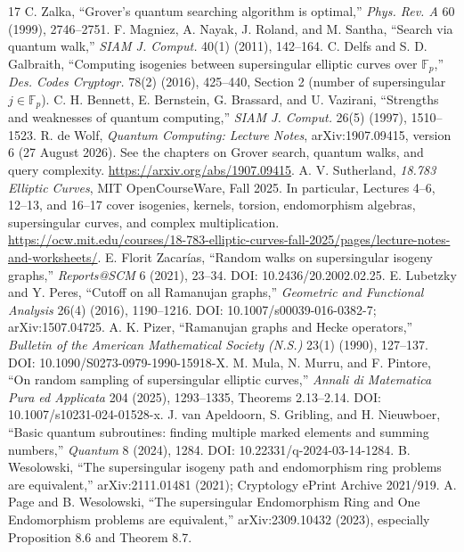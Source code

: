\documentclass[10pt,a4paper]{article}
\begin{document}
\begin{thebibliography}{17}\footnotesize\setlength{\itemsep}{0pt}
 C. Zalka, ``Grover's quantum searching algorithm is optimal,'' \emph{Phys. Rev. A} 60 (1999), 2746--2751.
 F. Magniez, A. Nayak, J. Roland, and M. Santha, ``Search via quantum walk,'' \emph{SIAM J. Comput.} 40(1) (2011), 142--164.
 C. Delfs and S. D. Galbraith, ``Computing isogenies between supersingular elliptic curves over $\mathbb F_p$,'' \emph{Des. Codes Cryptogr.} 78(2) (2016), 425--440, Section 2 (number of supersingular $j\in\mathbb F_p$).
 C. H. Bennett, E. Bernstein, G. Brassard, and U. Vazirani, ``Strengths and weaknesses of quantum computing,'' \emph{SIAM J. Comput.} 26(5) (1997), 1510--1523.
 R. de Wolf, \emph{Quantum Computing: Lecture Notes}, arXiv:1907.09415, version 6 (27 August 2026). See the chapters on Grover search, quantum walks, and query complexity. \url{https://arxiv.org/abs/1907.09415}.
 A. V. Sutherland, \emph{18.783 Elliptic Curves}, MIT OpenCourseWare, Fall 2025. In particular, Lectures 4--6, 12--13, and 16--17 cover isogenies, kernels, torsion, endomorphism algebras, supersingular curves, and complex multiplication. \url{https://ocw.mit.edu/courses/18-783-elliptic-curves-fall-2025/pages/lecture-notes-and-worksheets/}.
 E. Florit Zacar\'ias, ``Random walks on supersingular isogeny graphs,'' \emph{Reports@SCM} 6 (2021), 23--34. DOI: 10.2436/20.2002.02.25.
 E. Lubetzky and Y. Peres, ``Cutoff on all Ramanujan graphs,'' \emph{Geometric and Functional Analysis} 26(4) (2016), 1190--1216. DOI: 10.1007/s00039-016-0382-7; arXiv:1507.04725.
 A. K. Pizer, ``Ramanujan graphs and Hecke operators,'' \emph{Bulletin of the American Mathematical Society (N.S.)} 23(1) (1990), 127--137. DOI: 10.1090/S0273-0979-1990-15918-X.
 M. Mula, N. Murru, and F. Pintore, ``On random sampling of supersingular elliptic curves,'' \emph{Annali di Matematica Pura ed Applicata} 204 (2025), 1293--1335, Theorems 2.13--2.14. DOI: 10.1007/s10231-024-01528-x.
 J. van Apeldoorn, S. Gribling, and H. Nieuwboer, ``Basic quantum subroutines: finding multiple marked elements and summing numbers,'' \emph{Quantum} 8 (2024), 1284. DOI: 10.22331/q-2024-03-14-1284.
 B. Wesolowski, ``The supersingular isogeny path and endomorphism ring problems are equivalent,'' arXiv:2111.01481 (2021); Cryptology ePrint Archive 2021/919.
 A. Page and B. Wesolowski, ``The supersingular Endomorphism Ring and One Endomorphism problems are equivalent,'' arXiv:2309.10432 (2023), especially Proposition 8.6 and Theorem 8.7.

\end{thebibliography}
\end{document}
